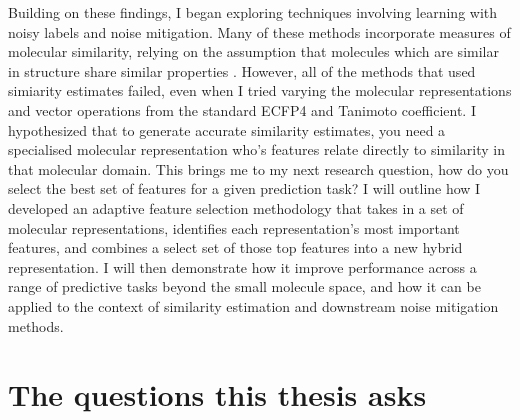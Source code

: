 Building on these findings, I began exploring techniques involving learning with noisy labels and noise mitigation. Many of these methods incorporate measures of molecular similarity, relying on the assumption that molecules which are similar in structure share similar properties \citep{LopezPerez2024}. However, all of the methods that used simiarity estimates failed, even when I tried varying the molecular representations and vector operations from the standard ECFP4 and Tanimoto coefficient. I hypothesized that to generate accurate similarity estimates, you need a specialised molecular representation who's features relate directly to similarity in that molecular domain. This brings me to my next research question, how do you select the best set of features for a given prediction task? I will outline how I developed an adaptive feature selection methodology that takes in a set of molecular representations, identifies each representation's most important features, and combines a select set of those top features into a new hybrid representation. I will then demonstrate how it improve performance across a range of predictive tasks beyond the small molecule space, and how it can be applied to the context of similarity estimation and downstream noise mitigation methods. 


\section{The questions this thesis asks}\label{sec:intro:questions}

%

